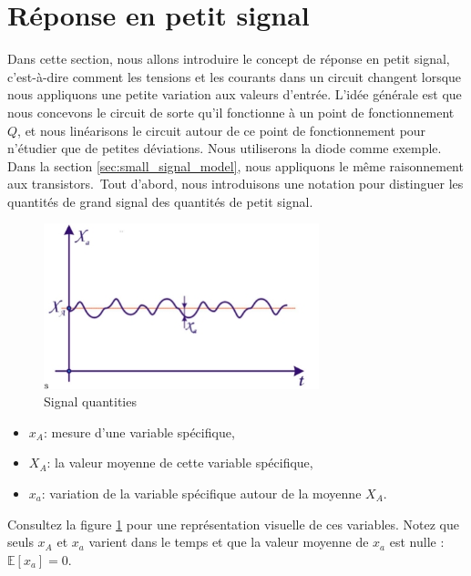 \section{Réponse en petit signal}
\label{sec:small_signal_response}
Dans cette section, nous allons introduire le concept de réponse en petit signal, c'est-à-dire comment les tensions et les courants dans un circuit changent lorsque nous appliquons une petite variation aux valeurs d'entrée. L'idée générale est que nous concevons le circuit de sorte qu'il fonctionne à un point de fonctionnement $Q$, et nous linéarisons le circuit autour de ce point de fonctionnement pour n'étudier que de petites déviations. Nous utiliserons la diode comme exemple. Dans la section \ref{sec:small_signal_model}, nous appliquons le même raisonnement aux transistors.\
Tout d'abord, nous introduisons une notation pour distinguer les quantités de grand signal des quantités de petit signal.

\begin{figure}[h!]
	\centering
	\includegraphics[width=8cm]{figures/ch02/small_signal_resp1.jpg}
	\caption{Signal quantities}
	\label{fig:small_signal_resp1}
\end{figure}
\begin{itemize}
	\item $x_A$: mesure d'une variable spécifique,
	\item $X_A$: la valeur moyenne de cette variable spécifique,
	\item $x_a$: variation de la variable spécifique autour de la moyenne $X_A$.
\end{itemize}
Consultez la figure \ref{fig:small_signal_resp1} pour une représentation visuelle de ces variables. Notez que seuls $x_A$ et $x_a$ varient dans le temps et que la valeur moyenne de $x_a$ est nulle : $\mathds{E}[x_a] = 0$.

